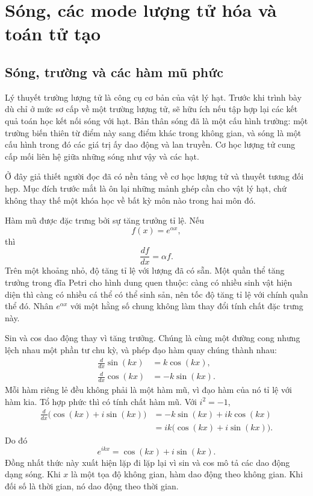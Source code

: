 \chapter{Sóng, các mode lượng tử hóa và toán tử tạo}

\section{Sóng, trường và các hàm mũ phức}

Lý thuyết trường lượng tử là công cụ cơ bản của vật lý hạt. Trước khi trình bày dù chỉ ở mức sơ cấp về một trường lượng tử, sẽ hữu ích nếu tập hợp lại các kết quả toán học kết nối sóng với hạt. Bản thân sóng đã là một cấu hình trường: một trường biến thiên từ điểm này sang điểm khác trong không gian, và sóng là một cấu hình trong đó các giá trị ấy dao động và lan truyền. Cơ học lượng tử cung cấp mối liên hệ giữa những sóng như vậy và các hạt.

Ở đây giả thiết người đọc đã có nền tảng về cơ học lượng tử và thuyết tương đối hẹp. Mục đích trước mắt là ôn lại những mảnh ghép cần cho vật lý hạt, chứ không thay thế một khóa học về bất kỳ môn nào trong hai môn đó.

Hàm mũ được đặc trưng bởi sự tăng trưởng tỉ lệ. Nếu
\begin{equation}
f(x)=e^{\alpha x},
\end{equation}
thì
\begin{equation}
\frac{df}{dx}=\alpha f.
\end{equation}
Trên một khoảng nhỏ, độ tăng tỉ lệ với lượng đã có sẵn. Một quần thể tăng trưởng trong đĩa Petri cho hình dung quen thuộc: càng có nhiều sinh vật hiện diện thì càng có nhiều cá thể có thể sinh sản, nên tốc độ tăng tỉ lệ với chính quần thể đó. Nhân \(e^{\alpha x}\) với một hằng số chung không làm thay đổi tính chất đặc trưng này.

Sin và cos dao động thay vì tăng trưởng. Chúng là cùng một đường cong nhưng lệch nhau một phần tư chu kỳ, và phép đạo hàm quay chúng thành nhau:
\begin{align}
\frac{d}{dx}\sin(kx)&=k\cos(kx),\\
\frac{d}{dx}\cos(kx)&=-k\sin(kx).
\end{align}
Mỗi hàm riêng lẻ đều không phải là một hàm mũ, vì đạo hàm của nó tỉ lệ với hàm kia. Tổ hợp phức thì có tính chất hàm mũ. Với \(i^2=-1\),
\begin{align}
\frac{d}{dx}\bigl(\cos(kx)+i\sin(kx)\bigr)
&=-k\sin(kx)+ik\cos(kx)\\
&=ik\bigl(\cos(kx)+i\sin(kx)\bigr).
\end{align}
Do đó
\begin{equation}
e^{ikx}=\cos(kx)+i\sin(kx).
\end{equation}
Đồng nhất thức này xuất hiện lặp đi lặp lại vì sin và cos mô tả các dao động dạng sóng. Khi \(x\) là một tọa độ không gian, hàm dao động theo không gian. Khi đối số là thời gian, nó dao động theo thời gian.

